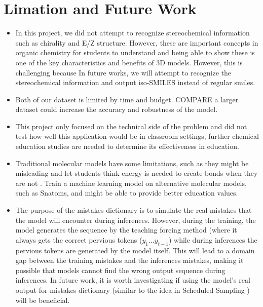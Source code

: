 \documentclass[12pt]{article}
\begin{document}
\section{Limation and Future Work}
\begin{itemize}
\item In this project, we did not attempt to recognize stereochemical information such as chirality and E/Z structure. However, these are important concepts in organic chemistry for students to understand and being able to show these is one of the key characteristics and benefits of 3D models. However, this is challenging because  
In future works, we will attempt to recognize the stereochemical information and output iso-SMILES instead of regular smiles. 

\item Both of our dataset is limited by time and budget. COMPARE a larger dataset could increase the accuracy and robustness of the model. 

\item This project only focused on the technical side of the problem and did not test how well this application would be in classroom settings, further chemical education studies are needed to determine its effectiveness in education. 

\item Traditional molecular models have some limitations, such as they might be misleading and let students think energy is needed to create bonds when they are not \autocite{snatoms}. Train a machine learning model on alternative molecular models, such as Snatoms\autocite{snatoms}, and might be able to provide better education values. 

\item  The purpose of the mistakes dictionary is to simulate the real mistakes that the model will encounter during inferences. However, during the training, the model generates the sequence by the teaching forcing method (where it always gets the correct pervious tokens ($y_1 \dots y_{t-1}$) while during inferences the pervious tokens are generated by the model itself. This will lead to a domain gap between the training mistakes and the inferences mistakes, making it possible that models cannot find the wrong output sequence during inferences. In future work, it is worth investigating if using the model's real output for mistakes dictionary (similar to the idea in Scheduled Sampling \autocite{bengio_scheduled_2015}) will be beneficial. 


\end{itemize}
\end{document}
